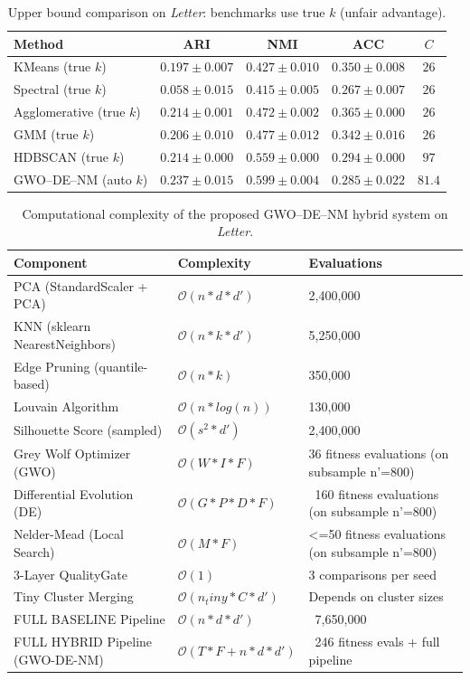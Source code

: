 \begin{table}[htbp]
\centering\small
\caption{Upper bound comparison on \textit{Letter}: benchmarks use true $k$ (unfair advantage).}
\label{tab:upper_letter}
\begin{tabular}{lcccc}
\toprule
Method & ARI & NMI & ACC & $C$ \\
\midrule
KMeans (true $k$) & $0.197 \pm 0.007$ & $0.427 \pm 0.010$ & $0.350 \pm 0.008$ & $26$ \\
Spectral (true $k$) & $0.058 \pm 0.015$ & $0.415 \pm 0.005$ & $0.267 \pm 0.007$ & $26$ \\
Agglomerative (true $k$) & $0.214 \pm 0.001$ & $0.472 \pm 0.002$ & $0.365 \pm 0.000$ & $26$ \\
GMM (true $k$) & $0.206 \pm 0.010$ & $0.477 \pm 0.012$ & $0.342 \pm 0.016$ & $26$ \\
HDBSCAN (true $k$) & $0.214 \pm 0.000$ & $0.559 \pm 0.000$ & $0.294 \pm 0.000$ & $97$ \\
\midrule
GWO--DE--NM (auto $k$) & $\mathbf{0.237 \pm 0.015}$ & $\mathbf{0.599 \pm 0.004}$ & $\mathbf{0.285 \pm 0.022}$ & $81.4$ \\
\bottomrule
\end{tabular}
\end{table}

\begin{table}[htbp]
\centering
\small
\caption{Computational complexity of the proposed GWO--DE--NM hybrid system on \textit{Letter}.}
\label{tab:complexity_letter}
\begin{tabular}{lll}
\toprule
Component & Complexity & Evaluations \\
\midrule
PCA (StandardScaler + PCA) & $\mathcal{O}(n * d * d')$ & 2,400,000 \\
KNN (sklearn NearestNeighbors) & $\mathcal{O}(n * k * d')$ & 5,250,000 \\
Edge Pruning (quantile-based) & $\mathcal{O}(n * k)$ & 350,000 \\
Louvain Algorithm & $\mathcal{O}(n * log(n))$ & 130,000 \\
Silhouette Score (sampled) & $\mathcal{O}(s^2 * d')$ & 2,400,000 \\
Grey Wolf Optimizer (GWO) & $\mathcal{O}(W * I * F)$ & 36 fitness evaluations (on subsample n'=800) \\
Differential Evolution (DE) & $\mathcal{O}(G * P * D * F)$ & ~160 fitness evaluations (on subsample n'=800) \\
Nelder-Mead (Local Search) & $\mathcal{O}(M * F)$ & <=50 fitness evaluations (on subsample n'=800) \\
3-Layer QualityGate & $\mathcal{O}(1)$ & 3 comparisons per seed \\
Tiny Cluster Merging & $\mathcal{O}(n_tiny * C * d')$ & Depends on cluster sizes \\
\midrule
FULL BASELINE Pipeline & $\mathcal{O}(n * d * d')$ & ~7,650,000 \\
\midrule
FULL HYBRID Pipeline (GWO-DE-NM) & $\mathcal{O}(T * F + n * d * d')$ & ~246 fitness evals + full pipeline \\
\bottomrule
\end{tabular}
\end{table}